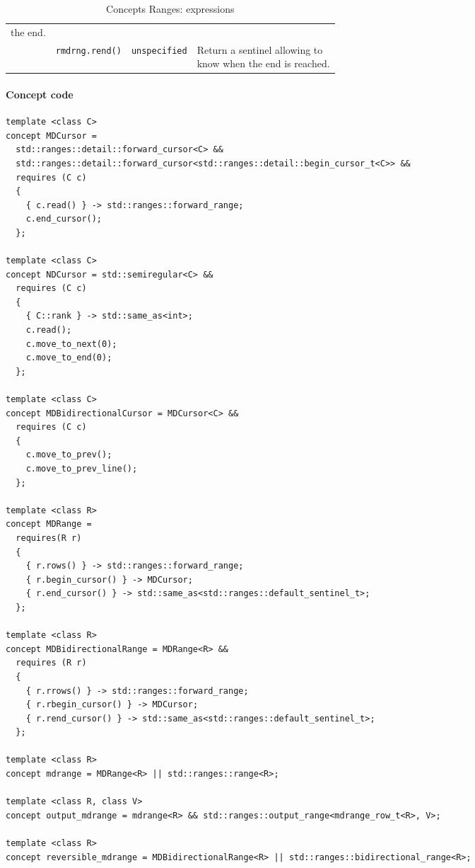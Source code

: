 \begin{table}[H]
\begin{scriptsize}
\begin{tabular}{llll}
{      the end.}                                                                                                                                                \\
      \multicolumn{1}{c|}{}                                   & \texttt{rmdrng.rend()}                          &
      \texttt{unspecified}                                    & \makecell[l]{Return a sentinel allowing to                                                     \\ know when the end is reached.} \\
      \cline{1-4}
    \end{tabular}
    \smallskip

    \caption{Concepts Ranges: expressions}
  \end{scriptsize}
  \label{table:concept.ranges.expressions}
\end{table}

\paragraph{Concept code}

\begin{verbatim}
template <class C>
concept MDCursor =
  std::ranges::detail::forward_cursor<C> &&
  std::ranges::detail::forward_cursor<std::ranges::detail::begin_cursor_t<C>> &&
  requires (C c)
  {
    { c.read() } -> std::ranges::forward_range;
    c.end_cursor();
  };

template <class C>
concept NDCursor = std::semiregular<C> &&
  requires (C c)
  {
    { C::rank } -> std::same_as<int>;
    c.read();
    c.move_to_next(0);
    c.move_to_end(0);
  };

template <class C>
concept MDBidirectionalCursor = MDCursor<C> &&
  requires (C c)
  {
    c.move_to_prev();
    c.move_to_prev_line();
  };

template <class R>
concept MDRange =
  requires(R r)
  {
    { r.rows() } -> std::ranges::forward_range;
    { r.begin_cursor() } -> MDCursor;
    { r.end_cursor() } -> std::same_as<std::ranges::default_sentinel_t>;
  };

template <class R>
concept MDBidirectionalRange = MDRange<R> &&
  requires (R r)
  {
    { r.rrows() } -> std::ranges::forward_range;
    { r.rbegin_cursor() } -> MDCursor;
    { r.rend_cursor() } -> std::same_as<std::ranges::default_sentinel_t>;
  };

template <class R>
concept mdrange = MDRange<R> || std::ranges::range<R>;

template <class R, class V>
concept output_mdrange = mdrange<R> && std::ranges::output_range<mdrange_row_t<R>, V>;

template <class R>
concept reversible_mdrange = MDBidirectionalRange<R> || std::ranges::bidirectional_range<R>;
\end{verbatim}

